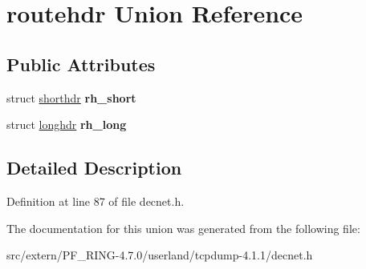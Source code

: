 \hypertarget{unionroutehdr}{
\section{routehdr Union Reference}
\label{unionroutehdr}
}
\subsection*{Public Attributes}
\begin{DoxyCompactItemize}
\item 
\hypertarget{unionroutehdr_a82d11c9d3185c24edf1b9c75291ba2fd}{
struct \hyperlink{structshorthdr}{shorthdr} {\bfseries rh\_\-short}}
\label{unionroutehdr_a82d11c9d3185c24edf1b9c75291ba2fd}

\item 
\hypertarget{unionroutehdr_afef5c7068811f766d5856e52c44082c3}{
struct \hyperlink{structlonghdr}{longhdr} {\bfseries rh\_\-long}}
\label{unionroutehdr_afef5c7068811f766d5856e52c44082c3}

\end{DoxyCompactItemize}


\subsection{Detailed Description}


Definition at line 87 of file decnet.h.



The documentation for this union was generated from the following file:\begin{DoxyCompactItemize}
\item 
src/extern/PF\_\-RING-\/4.7.0/userland/tcpdump-\/4.1.1/decnet.h\end{DoxyCompactItemize}
